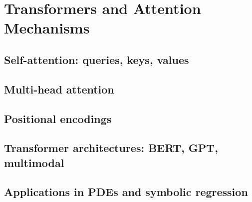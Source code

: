 ﻿\chapter{Transformers and Attention Mechanisms}
\section{Self-attention: queries, keys, values}

\section{Multi-head attention}

\section{Positional encodings}

\section{Transformer architectures: BERT, GPT, multimodal}

\section{Applications in PDEs and symbolic regression}


